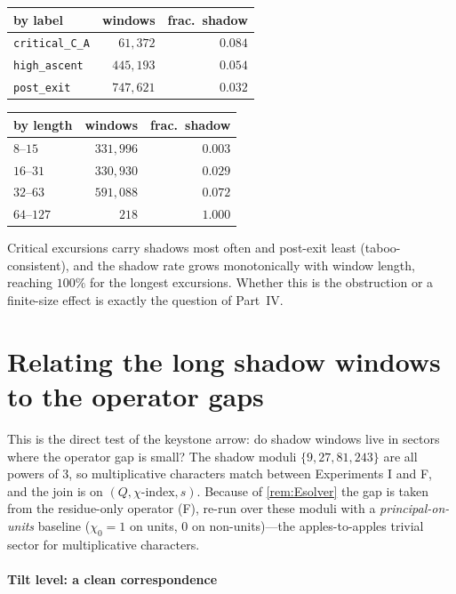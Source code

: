 \documentclass[11pt]{article}
\theoremstyle{plain}
\theoremstyle{remark}
\begin{document}
\begin{center}
\renewcommand{\arraystretch}{1.15}
\begin{tabular}{@{}lrr@{}}
\toprule
\textbf{by label} & windows & frac.\ shadow\\
\midrule
\texttt{critical\_C\_A} & $61{,}372$ & $0.084$\\
\texttt{high\_ascent}   & $445{,}193$ & $0.054$\\
\texttt{post\_exit}     & $747{,}621$ & $0.032$\\
\bottomrule
\end{tabular}
\hspace{2em}
\begin{tabular}{@{}lrr@{}}
\toprule
\textbf{by length} & windows & frac.\ shadow\\
\midrule
$8$--$15$   & $331{,}996$ & $0.003$\\
$16$--$31$  & $330{,}930$ & $0.029$\\
$32$--$63$  & $591{,}088$ & $0.072$\\
$64$--$127$ & $218$ & $\mathbf{1.000}$\\
\bottomrule
\end{tabular}
\end{center}
\noindent Critical excursions carry shadows most often and post-exit least
(taboo-consistent), and the shadow rate grows monotonically with window length,
reaching $100\%$ for the longest excursions. Whether this is the obstruction or a
finite-size effect is exactly the question of Part~IV.

\part{Relating the long shadow windows to the operator gaps}

This is the direct test of the keystone arrow: do shadow windows live in sectors
where the operator gap is small? The shadow moduli $\{9,27,81,243\}$ are all powers
of $3$, so multiplicative characters match between Experiments I and F, and the
join is on $(Q,\chi\text{-index},s)$. Because of \cref{rem:Esolver} the gap is
taken from the residue-only operator (F), re-run over these moduli with a
\emph{principal-on-units} baseline ($\chi_0=1$ on units, $0$ on non-units)---the
apples-to-apples trivial sector for multiplicative characters.

\subsection*{Tilt level: a clean correspondence}
\end{document}
